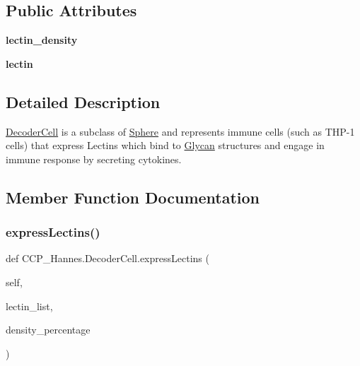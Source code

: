 \subsection*{Public Attributes}
\begin{DoxyCompactItemize}
\item 
\mbox{\label{class_c_c_p___hannes_1_1_decoder_cell_afcf4b1d70245a88a187c0409e9697a43}} 
{\bfseries lectin\+\_\+density}
\item 
\mbox{\label{class_c_c_p___hannes_1_1_decoder_cell_a156ae46d12ffe483195b5b9497f19dc5}} 
{\bfseries lectin}
\end{DoxyCompactItemize}


\subsection{Detailed Description}
\mbox{\hyperlink{class_c_c_p___hannes_1_1_decoder_cell}{Decoder\+Cell}} is a subclass of \mbox{\hyperlink{class_c_c_p___hannes_1_1_sphere}{Sphere}} and represents immune cells (such as T\+H\+P-\/1 cells) that express Lectins which bind to \mbox{\hyperlink{class_c_c_p___hannes_1_1_glycan}{Glycan}} structures and engage in immune response by secreting cytokines. 



\subsection{Member Function Documentation}
\mbox{\label{class_c_c_p___hannes_1_1_decoder_cell_afd9c75a3e3a0b21822db336db465df33}} 
\subsubsection{\texorpdfstring{express\+Lectins()}{expressLectins()}}
{\footnotesize\ttfamily def C\+C\+P\+\_\+\+Hannes.\+Decoder\+Cell.\+express\+Lectins (\begin{DoxyParamCaption}\item[{}]{self,  }\item[{}]{lectin\+\_\+list,  }\item[{}]{density\+\_\+percentage }\end{DoxyParamCaption})}



